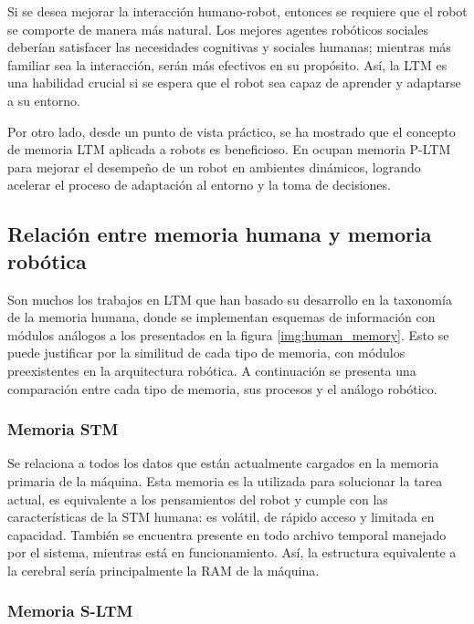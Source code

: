 Si se desea mejorar la interacción humano-robot, entonces se requiere que el robot se comporte de manera más natural. Los mejores agentes robóticos sociales deberían satisfacer las necesidades cognitivas y sociales humanas; mientras más familiar sea la interacción, serán más efectivos en su propósito. Así, la LTM es una habilidad crucial si se espera que el robot sea capaz de aprender y adaptarse a su entorno.


Por otro lado, desde un punto de vista práctico, se ha mostrado que el concepto de memoria LTM aplicada a robots es beneficioso. En \cite{Salgado2012} ocupan memoria P-LTM para mejorar el desempeño de un robot en ambientes dinámicos, logrando acelerar el proceso de adaptación al entorno y la toma de decisiones.



\subsection{Relación entre memoria humana y memoria robótica}


Son muchos los trabajos en LTM que han basado su desarrollo en la taxonomía de la memoria humana, donde se implementan esquemas de información con módulos análogos a los presentados en la figura \ref{img:human_memory}. Esto se puede justificar por la similitud de cada tipo de memoria, con módulos preexistentes en la arquitectura robótica. A continuación se presenta una comparación entre cada tipo de memoria, sus procesos y el análogo robótico.

\subsubsection{Memoria STM}

Se relaciona a todos los datos que están actualmente cargados en la memoria primaria de la máquina. Esta memoria es la utilizada para solucionar la tarea actual, es equivalente a los pensamientos del robot y cumple con las características de la STM humana: es volátil, de rápido acceso y limitada en capacidad. También se encuentra presente en todo archivo temporal manejado por el sistema, mientras está en funcionamiento. Así, la estructura equivalente a la cerebral sería principalmente la RAM de la máquina.


\subsubsection{Memoria S-LTM}

